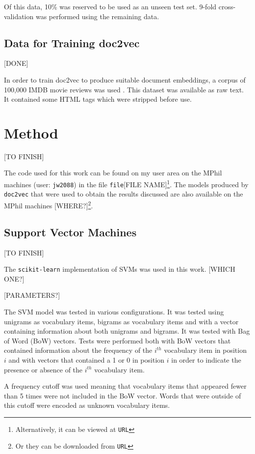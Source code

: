 \documentclass[twocolumn]{article}
\begin{document}
Of this data, 10\% was reserved to be used as an unseen test set. 9-fold cross-validation was performed using the remaining data.

\subsection{Data for Training doc2vec}

[DONE]


In order to train doc2vec to produce suitable document embeddings, a corpus of 100,000 IMDB movie reviews was used \cite{bigimdb}. This dataset was available as raw text. It contained some HTML tags which were stripped before use.

\section{Method}

[TO FINISH]

The code used for this work can be found on my user area on the MPhil machines (user: \texttt{jw2088}) in the file \texttt{file}[FILE NAME]\footnote{Alternatively, it can be viewed at \texttt{{URL}}}. The models produced by \texttt{doc2vec} that were used to obtain the results discussed are also available on the MPhil machines [WHERE?]\footnote{Or they can be downloaded from \texttt{{URL}}}. 

\subsection{Support Vector Machines}

[TO FINISH]


The \texttt{scikit-learn}\cite{scikit-learn} implementation of SVMs was used in this work. [WHICH ONE?]

[PARAMETERS?]

The SVM model was tested in various configurations. It was tested using unigrams as vocabulary items, bigrams as vocabulary items and with a vector containing information about both unigrams and bigrams. It was tested with Bag of Word (BoW) vectors. Tests were performed both with BoW vectors that contained information about the frequency of the $i^{th}$ vocabulary item in position $i$ and with vectors that contained a 1 or 0 in position $i$ in order to indicate the presence or absence of the $i^{th}$ vocabulary item. 

A frequency cutoff was used meaning that vocabulary items that appeared fewer than 5 times were not included in the BoW vector. Words that were outside of this cutoff were encoded as unknown vocabulary items.
\end{document}
